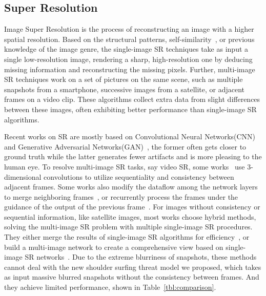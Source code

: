 \subsection{Super Resolution}
Image Super Resolution is the process of reconstructing an image with a higher spatial resolution. Based on the structural patterns, self-similarity~\cite{suetake2008image}, or previous knowledge of the image genre, the single-image SR techniques take as input a single low-resolution image, rendering a sharp, high-resolution one by deducing missing information and reconstructing the missing pixels. Further, multi-image SR techniques work on a set of pictures on the same scene, such as multiple snapshots from a smartphone, successive images from a satellite, or adjacent frames on a video clip. These algorithms collect extra data from slight differences between these images, often exhibiting better performance than single-image SR algorithms.

Recent works on SR are mostly based on Convolutional Neural Networks(CNN)~\cite{dong2015image} and Generative Adversarial Networks(GAN)~\cite{ledig2017photo}, the former often gets closer to ground truth while the latter generates fewer artifacts and is more pleasing to the human eye. To resolve multi-image SR tasks, say video SR, some works~\cite{shi2016real,kappeler2016video} use 3-dimensional convolutions to utilize sequentiality and consistency between adjacent frames. Some works also modify the dataflow among the network layers to merge neighboring frames~\cite{huang2017video}, or recurrently process the frames under the guidance of the output of the previous frame~\cite{sajjadi2018frame}. For images without consistency or sequential information, like satellite images, most works choose hybrid methods, solving the multi-image SR problem with multiple single-image SR procedures. They either merge the results of single-image SR algorithms for efficiency~\cite{kawulok2019deep}, or build a multi-image network to create a comprehensive view based on single-image SR networks~\cite{8834937}. Due to the extreme blurriness of snapshots, these methods cannot deal with the new shoulder surfing threat model we proposed, which takes as input massive blurred snapshots without the consistency between frames. And they achieve limited performance, shown in Table~\ref{tbl:comparison}.

